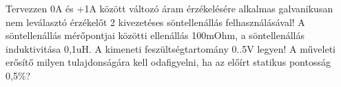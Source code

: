 \begin{example}

Tervezzen 0A és +1A között változó áram érzékelésére alkalmas galvanikusan nem leválasztó érzékelőt 2 kivezetéses söntellenállás felhasználásával! A söntellenállás mérőpontjai közötti ellenállás 100mOhm, a söntellenállás induktivitása 0,1uH. A kimeneti feszültségtartomány 0..5V legyen! A műveleti erősítő milyen tulajdonságára kell odafigyelni, ha az előírt statikus pontosság 0,5\%?

\tcbline
\vspace{1mm}

\solution

\end{example}